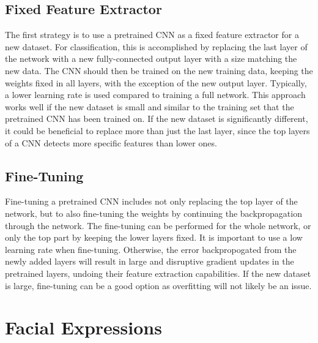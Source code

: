 
\subsection{Fixed Feature Extractor}

The first strategy is to use a pretrained CNN as a fixed feature extractor for a new dataset. For classification, this is accomplished by replacing the last layer of the network with a new fully-connected output layer with a size matching the new data. The CNN should then be trained on the new training data, keeping the weights fixed in all layers, with the exception of the new output layer. Typically, a lower learning rate is used compared to training a full network. This approach works well if the new dataset is small and similar to the training set that the pretrained CNN has been trained on. If the new dataset is significantly different, it could be beneficial to replace more than just the last layer, since the top layers of a CNN detects more specific features than lower ones. 

\subsection{Fine-Tuning}

Fine-tuning a pretrained CNN includes not only replacing the top layer of the network, but to also fine-tuning the weights by continuing the backpropagation through the network. The fine-tuning can be performed for the whole network, or only the top part by keeping the lower layers fixed. It is important to use a low learning rate when fine-tuning. Otherwise, the error backpropogated from the newly added layers will result in large and disruptive gradient updates in the pretrained layers, undoing their feature extraction capabilities. If the new dataset is large, fine-tuning can be a good option as overfitting will not likely be an issue. 



\section{Facial Expressions} %

